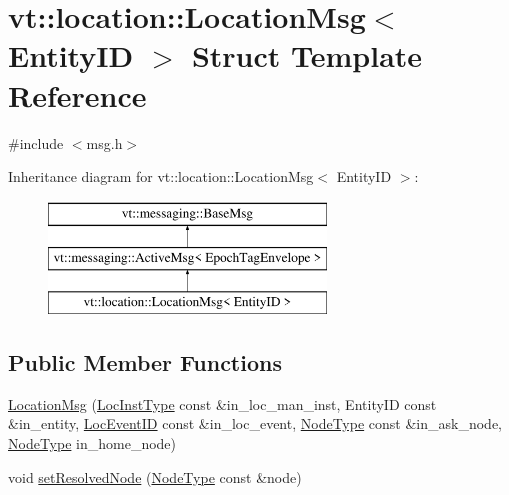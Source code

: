 \hypertarget{structvt_1_1location_1_1_location_msg}{}\section{vt\+:\+:location\+:\+:Location\+Msg$<$ Entity\+ID $>$ Struct Template Reference}
\label{structvt_1_1location_1_1_location_msg}


{\ttfamily \#include $<$msg.\+h$>$}

Inheritance diagram for vt\+:\+:location\+:\+:Location\+Msg$<$ Entity\+ID $>$\+:\begin{figure}[H]
\begin{center}
\leavevmode
\includegraphics[height=3.000000cm]{structvt_1_1location_1_1_location_msg}
\end{center}
\end{figure}
\subsection*{Public Member Functions}
\begin{DoxyCompactItemize}
\item 
\hyperlink{structvt_1_1location_1_1_location_msg_af1b76aa81c81ed8ed2a9c9db4e5cff45}{Location\+Msg} (\hyperlink{namespacevt_1_1location_a4db6456e8024af2d23fc5ae560fef866}{Loc\+Inst\+Type} const \&in\+\_\+loc\+\_\+man\+\_\+inst, Entity\+ID const \&in\+\_\+entity, \hyperlink{namespacevt_1_1location_aa5ccc1a42aa22b0b41fcfbbdee314dca}{Loc\+Event\+ID} const \&in\+\_\+loc\+\_\+event, \hyperlink{namespacevt_a866da9d0efc19c0a1ce79e9e492f47e2}{Node\+Type} const \&in\+\_\+ask\+\_\+node, \hyperlink{namespacevt_a866da9d0efc19c0a1ce79e9e492f47e2}{Node\+Type} in\+\_\+home\+\_\+node)
\item 
void \hyperlink{structvt_1_1location_1_1_location_msg_a98f01158208640bb88e0d4583694f9bb}{set\+Resolved\+Node} (\hyperlink{namespacevt_a866da9d0efc19c0a1ce79e9e492f47e2}{Node\+Type} const \&node)
\end{DoxyCompactItemize}

